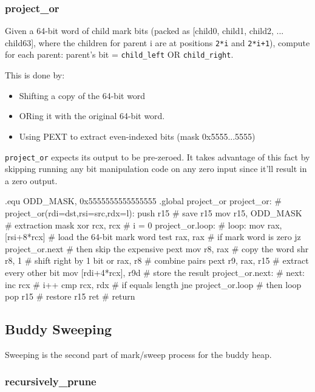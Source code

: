 \subsubsection{project\_or}

Given a 64-bit word of child mark bits (packed as [child0, child1,
child2, ... child63], where the children for parent i are at positions
\lstinline|2*i| and \lstinline|2*i+1|), compute for each parent: parent's
bit = \lstinline|child_left| OR \lstinline|child_right|.

This is done by:

\begin{itemize}
\item Shifting a copy of the 64-bit word
\item ORing it with the original 64-bit word.
\item Using PEXT to extract even-indexed bits (mask 0x5555...5555)
\end{itemize}

\lstinline|project_or| expects its output to be pre-zeroed. It takes advantage
of this fact by skipping running any bit manipulation code on any zero input
since it'll result in a zero output.

\begin{asm}
.equ ODD_MASK, 0x5555555555555555
.global project_or
project_or:				    # project_or(rdi=dst,rsi=src,rdx=l):
	push	r15			    #   save r15
	mov	r15, ODD_MASK		    #   extraction mask
	xor	rcx, rcx		    #   i = 0
project_or.loop:			    # loop:
	mov	rax, [rsi+8*rcx]	    #   load the 64-bit mark word
	test	rax, rax                    #   if mark word is zero
	jz	project_or.next             #   then skip the expensive pext
	mov	r8, rax			    #   copy the word
	shr	r8, 1			    #   shift right by 1 bit
	or	rax, r8			    #   combine pairs
	pext	r9, rax, r15		    #   extract every other bit
	mov	[rdi+4*rcx], r9d	    #   store the result
project_or.next:                            # next:
	inc	rcx			    #   i++
	cmp	rcx, rdx		    #   if equals length
	jne	project_or.loop 	    #   then loop
	pop	r15			    #   restore r15
	ret				    #   return
\end{asm}


\subsection{Buddy Sweeping}

Sweeping is the second part of mark/sweep process for the buddy heap.


\subsubsection{recursively\_prune}

